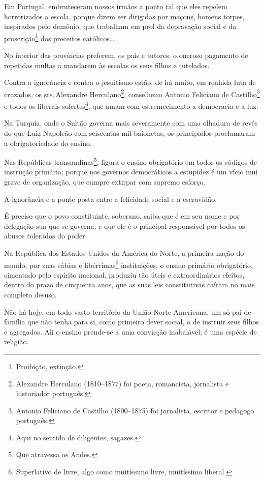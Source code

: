 Em Portugal, embruteceram nossos irmãos a ponto tal que eles repelem
horrorizados a escola, porque dizem ser dirigidas por maçons, homens
torpes, inspirados pelo demônio, que trabalham em prol da depravação
social e da proscrição\footnote{Proibição, extinção.} dos preceitos
católicos\ldots

No interior das províncias preferem, os pais e tutores, o oneroso
pagamento de repetidas multas a mandarem às escolas os seus filhos e
tutelados.

Contra a ignorância e contra o jesuitismo estão, de há muito, em renhida
luta de cruzados, os srs.\,Alexandre Herculano\footnote{Alexandre
  Herculano (1810--1877) foi poeta, romancista, jornalista e historiador
  português.}, conselheiro Antonio Feliciano de Castilho\footnote{
  Antonio Feliciano de Castilho (1800--1875) foi jornalista, escritor e
  pedagogo português.} e todos os liberais solertes\footnote{Aqui no
  sentido de diligentes, sagazes.}, que amam com estremecimento a
democracia e a luz.

Na Turquia, onde o Sultão governa mais severamente com uma olhadura de
revés do que Luiz Napoleão com seiscentas mil baionetas, os principados
proclamaram a obrigatoriedade do ensino.

Nas Repúblicas transandinas\footnote{Que atravessa os Andes.}, figura
o ensino obrigatório em todos os códigos de instrução primária; porque
nos governos democráticos a estupidez é um vício mui grave de
organização, que cumpre extirpar com supremo esforço.

A ignorância é a ponte posta entre a felicidade social e a escravidão.

É preciso que o povo constituinte, soberano, saiba que é em seu nome e
por delegação sua que se governa, e que ele é o principal responsável
por todos os abusos tolerados do poder.

Na República dos Estados Unidos da América do Norte, a primeira nação do
mundo, por suas sábias e libérrimas\footnote{Superlativo de livre,
  algo como muitíssimo livre, muitíssimo liberal.} instituições, o
ensino primário obrigatório, cimentado pelo espírito nacional, produziu
tão úteis e extraordinários efeitos, dentro do prazo de cinquenta anos,
que as suas leis constitutivas caíram no mais completo desuso.

Não há hoje, em todo vasto território da União Norte-Americana, um só
pai de família que não tenha para si, como primeiro dever social, o de
instruir seus filhos e agregados. Ali o ensino prende-se a uma convicção
inabalável; é uma espécie de religião.

